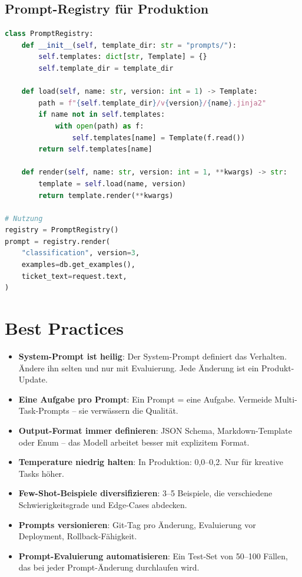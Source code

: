 \subsection{Prompt-Registry für Produktion}

\begin{lstlisting}[language=Python, caption=Prompt-Registry]
class PromptRegistry:
    def __init__(self, template_dir: str = "prompts/"):
        self.templates: dict[str, Template] = {}
        self.template_dir = template_dir

    def load(self, name: str, version: int = 1) -> Template:
        path = f"{self.template_dir}/v{version}/{name}.jinja2"
        if name not in self.templates:
            with open(path) as f:
                self.templates[name] = Template(f.read())
        return self.templates[name]

    def render(self, name: str, version: int = 1, **kwargs) -> str:
        template = self.load(name, version)
        return template.render(**kwargs)

# Nutzung
registry = PromptRegistry()
prompt = registry.render(
    "classification", version=3,
    examples=db.get_examples(),
    ticket_text=request.text,
)
\end{lstlisting}

\section{Best Practices}

\begin{itemize}[leftmargin=*]
    \item \textbf{System-Prompt ist heilig}: Der System-Prompt definiert das Verhalten. Ändere ihn selten und nur mit Evaluierung. Jede Änderung ist ein Produkt-Update.
    \item \textbf{Eine Aufgabe pro Prompt}: Ein Prompt = eine Aufgabe. Vermeide Multi-Task-Prompts -- sie verwässern die Qualität.
    \item \textbf{Output-Format immer definieren}: JSON Schema, Markdown-Template oder Enum -- das Modell arbeitet besser mit explizitem Format.
    \item \textbf{Temperature niedrig halten}: In Produktion: 0,0--0,2. Nur für kreative Tasks höher.
    \item \textbf{Few-Shot-Beispiele diversifizieren}: 3--5 Beispiele, die verschiedene Schwierigkeitsgrade und Edge-Cases abdecken.
    \item \textbf{Prompts versionieren}: Git-Tag pro Änderung, Evaluierung vor Deployment, Rollback-Fähigkeit.
    \item \textbf{Prompt-Evaluierung automatisieren}: Ein Test-Set von 50--100 Fällen, das bei jeder Prompt-Änderung durchlaufen wird.
\end{itemize}

